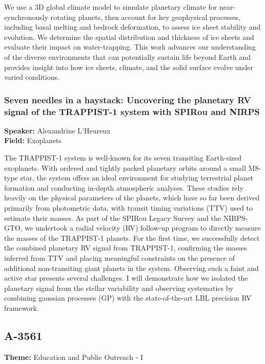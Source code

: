 We use a 3D global climate model to simulate planetary climate for near-synchronously rotating planets, then account for key geophysical processes, including basal melting and bedrock deformation, to assess ice sheet stability and evolution. We determine the spatial distribution and thickness of ice sheets and evaluate their impact on water-trapping. This work advances our understanding of the diverse environments that can potentially sustain life beyond Earth and provides insight into how ice sheets, climate, and the solid surface evolve under varied conditions.

\hypertarget{abstract-talk-167}{}\label{abstract-page-talk-167}
\subsubsection*{Seven needles in a haystack: Uncovering the planetary RV signal of the TRAPPIST-1 system with SPIRou and NIRPS}
\textbf{Speaker:} Alexandrine L'Heureux\\
\textbf{Field:} Exoplanets

The TRAPPIST-1 system is well-known for its seven transiting Earth-sized exoplanets. With ordered and tightly packed planetary orbits around a small M8-type star, the system offers an ideal environment for studying terrestrial planet formation and conducting in-depth atmospheric analyses. These studies rely heavily on the physical parameters of the planets, which have so far been derived primarily from photometric data, with transit timing variations (TTV) used to estimate their masses. As part of the SPIRou Legacy Survey and the NIRPS-GTO, we undertook a radial velocity (RV) follow-up program to directly measure the masses of the TRAPPIST-1 planets. For the first time, we successfully detect the combined planetary RV signal from TRAPPIST-1, confirming the masses inferred from TTV and placing meaningful constraints on the presence of additional non-transiting giant planets in the system. Observing such a faint and active star presents several challenges. I will demonstrate how we isolated the planetary signal from the stellar variability and observing systematics by combining gaussian processes (GP) with the state-of-the-art LBL precision RV framework.

\subsection*{A-3561}
\textbf{Theme:} Education and Public Outreach - I

